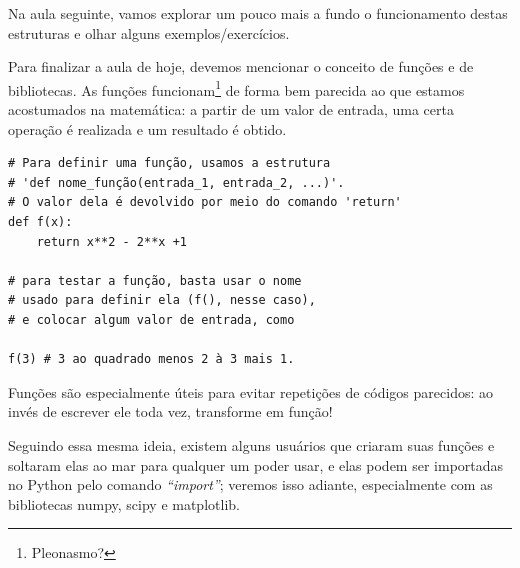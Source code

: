 \documentclass[../numerical_methods.tex]{subfiles}
\begin{document}
Na aula seguinte, vamos explorar um pouco mais a fundo o funcionamento destas estruturas e olhar alguns exemplos/exercícios.

Para finalizar a aula de hoje, devemos mencionar o conceito de funções e de bibliotecas. As funções funcionam\footnote{Pleonasmo?} de forma bem parecida ao que estamos acostumados na matemática: a partir de um valor de entrada, uma certa operação é realizada e um resultado é obtido.
\begin{verbatim}
# Para definir uma função, usamos a estrutura 
# 'def nome_função(entrada_1, entrada_2, ...)'.
# O valor dela é devolvido por meio do comando 'return'
def f(x):
    return x**2 - 2**x +1

# para testar a função, basta usar o nome 
# usado para definir ela (f(), nesse caso), 
# e colocar algum valor de entrada, como

f(3) # 3 ao quadrado menos 2 à 3 mais 1.
\end{verbatim}
Funções são especialmente úteis para evitar repetições de códigos parecidos: ao invés de escrever ele toda vez, transforme em função!

Seguindo essa mesma ideia, existem alguns usuários que criaram suas funções e soltaram elas ao mar para qualquer um poder usar, e elas podem ser importadas no Python pelo comando \textit{``import''}; veremos isso adiante, especialmente com as bibliotecas numpy, scipy e matplotlib.
\end{document}
